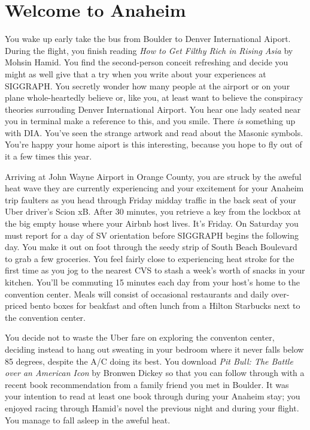\documentclass[../main.tex]{subfiles}
\begin{document}
\section{Welcome to Anaheim}

You wake up early take the bus from Boulder to Denver International Aiport. During the flight, you finish reading \textit{How to Get Filthy Rich in Rising Asia} by Mohsin Hamid. You find the second-person conceit refreshing and decide you might as well give that a try when you write about your experiences at SIGGRAPH. You secretly wonder how many people at the airport or on your plane whole-heartedly believe or, like you, at least want to believe the conspiracy theories surrouding Denver International Airport. You hear one lady seated near you in terminal make a reference to this, and you smile. There \textit{is} something up with DIA. You've seen the strange artwork and read about the Masonic symbols. You're happy your home aiport is this interesting, because you hope to fly out of it a few times this year.

Arriving at John Wayne Airport in Orange County, you are struck by the aweful heat wave they are currently experiencing and your excitement for your Anaheim trip faulters as you head through Friday midday traffic in the back seat of your Uber driver's Scion xB. After 30 minutes, you retrieve a key from the lockbox at the big empty house where your Airbnb host lives. It's Friday. On Saturday you must report for a day of SV orientation before SIGGRAPH begins the following day. You make it out on foot through the seedy strip of South Beach Boulevard to grab a few groceries. You feel fairly close to experiencing heat stroke for the first time as you jog to the nearest CVS to stash a week's worth of snacks in your kitchen. You'll be commuting 15 minutes each day from your host's home to the convention center. Meals will consist of occasional restaurants and daily over-priced bento boxes for beakfast and often lunch from a Hilton Starbucks next to the convention center.

You decide not to waste the Uber fare on exploring the conventon center, deciding instead to hang out sweating in your bedroom where it never falls below 85 degrees, despite the A/C doing its best. You download \textit{Pit Bull: The Battle over an American Icon} by Bronwen Dickey so that you can follow through with a recent book recommendation from a family friend you met in Boulder. It was your intention to read at least one book through during your Anaheim stay; you enjoyed racing through Hamid's novel the previous night and during your flight. You manage to fall asleep in the aweful heat.
 
\end{document}
